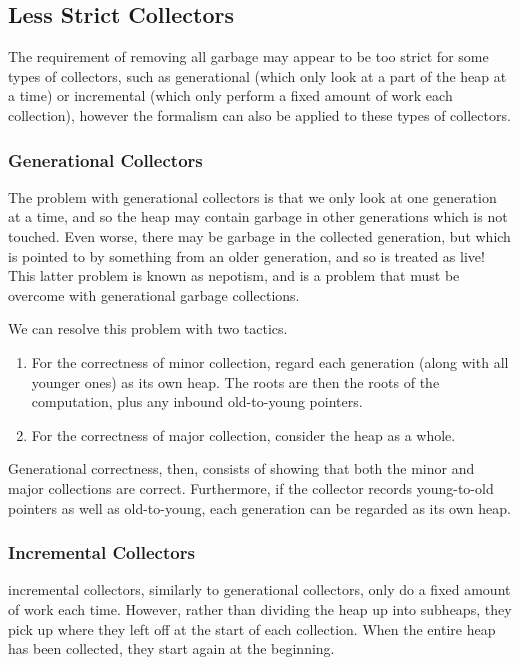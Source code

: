\subsection{Less Strict Collectors}

The requirement of removing all \gls{garbage} may appear to be too
strict for some types of collectors, such as generational (which only
look at a part of the heap at a time) or incremental (which only
perform a fixed amount of work each collection), however the formalism
can also be applied to these types of collectors.

\subsubsection{Generational Collectors}

The problem with generational collectors is that we only look at one
generation at a time, and so the heap may contain garbage in other
generations which is not touched. Even worse, there may be
\gls{garbage} in the collected generation, but which is pointed to by
something from an older generation, and so is treated as live! This
latter problem is known as \gls{nepotism}, and is a problem that must
be overcome with \glspl{generational garbage collection}.

We can resolve this problem with two tactics.

\begin{enumerate}
  \item For the correctness of minor collection, regard each
    generation (along with all younger ones) as its own
    \gls{heap}. The \glspl{root} are then the \glspl{root} of the
    computation, plus any inbound \glspl{old-to-young pointer}.

  \item For the correctness of major collection, consider the
    \gls{heap} as a whole.
\end{enumerate}

Generational correctness, then, consists of showing that both the
minor and major collections are correct. Furthermore, if the collector
records young-to-old pointers as well as old-to-young, each generation
can be regarded as its own heap.

\subsubsection{Incremental Collectors}

\Glspl{incremental collector}, similarly to generational collectors, only do
a fixed amount of work each time. However, rather than dividing the
heap up into subheaps, they pick up where they left off at the start
of each collection. When the entire heap has been collected, they
start again at the beginning.

